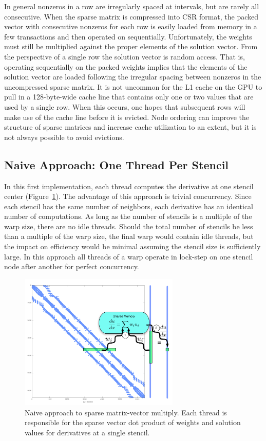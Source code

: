 \documentclass{report}
\begin{document}
In general nonzeros in a row are irregularly spaced at intervals, but are rarely all consecutive. When the sparse matrix is compressed into CSR format, the packed vector with consecutive nonzeros for each row is easily loaded from memory in a few transactions and then operated on sequentially. Unfortunately, the weights must still be multiplied against the proper elements of the solution vector. From the perspective of a single row the solution vector is random access. That is, operating sequentially on the packed weights implies that the elements of the solution vector are loaded following the irregular spacing between nonzeros in the uncompressed sparse matrix. It is not uncommon for the L1 cache on the GPU to pull in a 128-byte-wide cache line that contains only one or two values that are used by a single row. When this occurs, one hopes that subsequent rows will make use of the cache line before it is evicted. Node ordering can improve the structure of sparse matrices and increase cache utilization to an extent, but it is not always possible to avoid evictions. 


\subsection{Naive Approach: One Thread Per Stencil}

In this first implementation, each thread computes 
the derivative at one stencil center  (Figure~\ref{fig:oneThreadPerStencil}). 
The advantage of this approach is trivial concurrency.  Since each stencil has the same number of neighbors, each derivative has an identical number of computations. As long as the number of stencils is a multiple of the warp size, there are no idle threads. Should the total number of stencils be less than a multiple of the warp size, the final warp would contain idle threads, but the impact on efficiency would be minimal assuming the stencil size is sufficiently large. In this approach all threads of a warp operate in lock-step on one stencil node after another for perfect concurrency. %

\begin{figure}[ht]
      \centering
       \includegraphics[width=3in]{../figures/paper1/figures/omnigraffle/oneThreadPerStencil.pdf}
      \caption{Naive approach to sparse matrix-vector multiply. Each thread is responsible for the sparse vector dot product of weights and solution values for derivatives at a single stencil.  }
      \label{fig:oneThreadPerStencil}
\end{figure}
\end{document}
